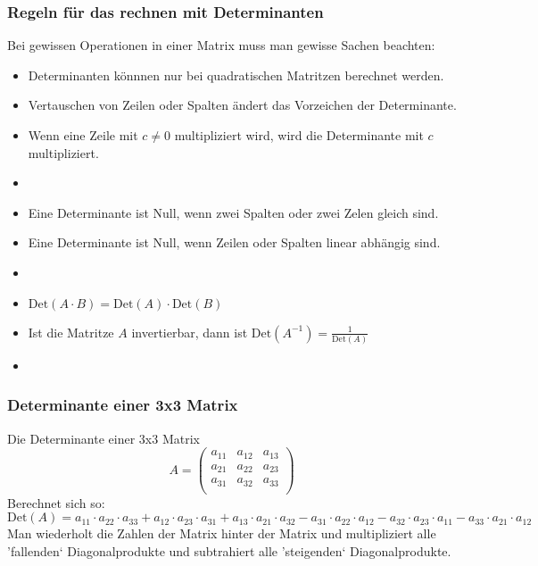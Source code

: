\subsubsection{Regeln für das rechnen mit Determinanten}
Bei gewissen Operationen in einer Matrix muss man gewisse Sachen
beachten:
\begin{itemize}
  \item Determinanten könnnen nur bei quadratischen Matritzen berechnet
    werden.
  \item Vertauschen von Zeilen oder Spalten ändert das Vorzeichen der
    Determinante.
  \item Wenn eine Zeile mit $c \ne 0$ multipliziert wird, wird die
    Determinante mit $c$ multipliziert.
  \item {}
  \item Eine Determinante ist Null, wenn zwei Spalten oder zwei Zelen
    gleich sind.
  \item Eine Determinante ist Null, wenn Zeilen oder Spalten linear
    abhängig sind.
  \item {}
  \item $\text{Det}(A \cdot B) = \text{Det}(A) \cdot \text{Det}(B)$
  \item Ist die Matritze $A$ invertierbar, dann ist $\text{Det}(A^{-1}) =
    \frac{1}{\text{Det}(A)}$
  \item {}
\end{itemize}


\subsubsection{Determinante einer 3x3 Matrix}
Die Determinante einer 3x3 Matrix
\[ A =
  \begin {pmatrix}
    a_{11} & a_{12} & a_{13} \\
    a_{21} & a_{22} & a_{23} \\
    a_{31} & a_{32} & a_{33} \\
  \end {pmatrix} \]
Berechnet sich so:
\[ \text{Det}(A) = 
a_{11} \cdot a_{22} \cdot a_{33} +
a_{12} \cdot a_{23} \cdot a_{31} +
a_{13} \cdot a_{21} \cdot a_{32} -
a_{31} \cdot a_{22} \cdot a_{12} -
a_{32} \cdot a_{23} \cdot a_{11} -
a_{33} \cdot a_{21} \cdot a_{12}
\]
Man wiederholt die Zahlen der Matrix hinter der Matrix und multipliziert
alle 'fallenden` Diagonalprodukte und subtrahiert alle 'steigenden`
Diagonalprodukte.

